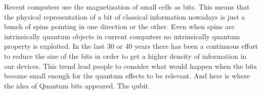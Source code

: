 Recent computers use the magnetization of small cells as bits. This means that the physical representation of a bit of classical information nowadays is just a bunch of spins pointing in one direction or the other.
Even when spins are intrinsically quantum objects in current computers no intrinsically quantum property is exploited.
In the last 30 or 40 years there has been a continuous effort to reduce the size of the bits in order to get a higher density of information in our devices. This trend lead people to consider what would happen when the bits become small enough for the quantum effects to be relevant. And here is where the idea of Quantum bits appeared.
The qubit.


